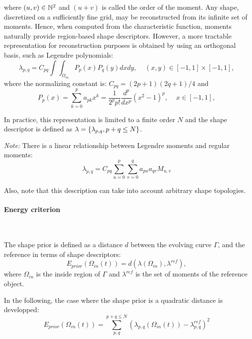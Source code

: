 where $(u, v) \in \mathbb{N}^2$ and $(u+v)$ is called the order of the moment. Any shape, discretized on a sufficiently fine grid, may be reconstructed from its infinite set of moments. Hence, when computed from the characteristic function, moments naturally provide region-based shape descriptors. However, a more tractable representation for reconstruction purposes is obtained by using an orthogonal basis, such as Legendre polynomials:
\begin{equation}
  \label{eq:moment_legendre}
   \lambda_{p,q} = C_{pq}\int\int_{\Omega_{in}} P_p(x) P_q(y) dxdy, \,\,\,\,\,\,\, (x,y) \in [-1,1]\times[-1,1],
\end{equation}
where the normalizing constant is: $C_{pq} = (2p+1)(2q+1)/4$ and
\begin{equation}
  \label{eq:poly_legendre}
   P_p(x) = \sum_{k=0}^p {a_{pk}x^k} = \frac{1}{2^p p!}\frac{d^p}{dx^p}(x^2-1)^p, \,\,\,\,\,\,\, x \in [-1,1],
\end{equation}

In practice, this representation is limited to a finite order $N$ and the shape descriptor is defined as $\mathbf{\lambda} = \left\lbrace \lambda_{p,q}, p+q \leq N \right\rbrace$.

\emph{Note:} There is a linear relationship between Legendre moments and regular moments:
\begin{equation}
  \label{eq:rel_Legendre_regular}
   \lambda_{p,q} = C_{pq} \sum_{u=0}^p{\sum_{v=0}^q{ a_{pu}a_{qv}M_{u,v} }}
\end{equation}

Also, note that this description can take into account arbitrary shape topologies.


\paragraph{Energy criterion}
~\par \vspace{0.3cm}
 The shape prior is defined as a distance $d$ between the evolving curve $\Gamma$, and the reference in terms of shape descriptors:
\begin{equation}
  \label{eq:NRJ_foulonneau1}
  E_{prior}(\Omega_{in}(t)) = d(\lambda(\Omega_{in}),\lambda^{ref}),
\end{equation}
where $\Omega_{in}$ is the inside region of $\Gamma$ and $\lambda^{ref}$ is the set of moments of the reference object.

In the following, the case where the shape prior is a quadratic distance is developped:
\begin{equation}
  \label{eq:NRJ_foulonneau2}
  E_{prior}(\Omega_{in}(t)) = \sum_{p,q}^{p+q \leq N} {\left( \lambda_{p,q}(\Omega_{in}(t)) - \lambda_{p,q}^{ref} \right)^2}
\end{equation}

